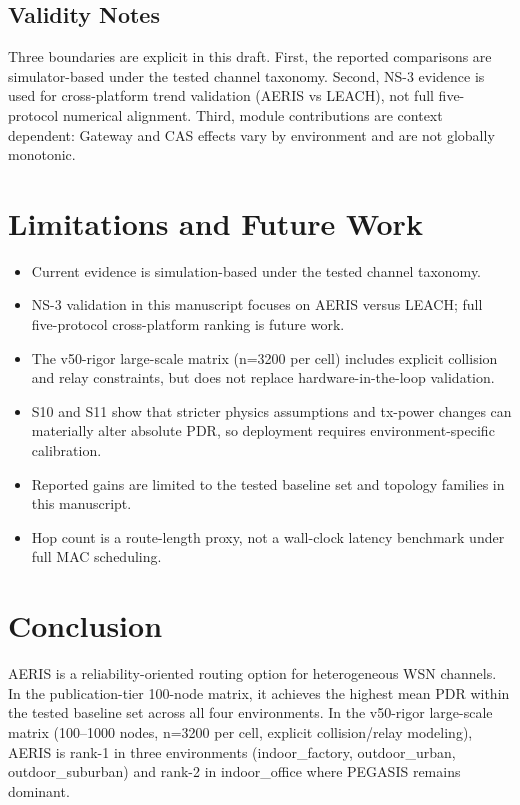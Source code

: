 ﻿\documentclass[sensors,article,submit,moreauthors,pdftex]{Definitions/mdpi}
\begin{document}
\subsection*{Validity Notes}
Three boundaries are explicit in this draft. First, the reported comparisons are simulator-based under the tested channel taxonomy. Second, NS-3 evidence is used for cross-platform trend validation (AERIS vs LEACH), not full five-protocol numerical alignment. Third, module contributions are context dependent: Gateway and CAS effects vary by environment and are not globally monotonic.

\section{Limitations and Future Work}
\begin{itemize}
\item Current evidence is simulation-based under the tested channel taxonomy.
\item NS-3 validation in this manuscript focuses on AERIS versus LEACH; full five-protocol cross-platform ranking is future work.
\item The v50-rigor large-scale matrix (n=3200 per cell) includes explicit collision and relay constraints, but does not replace hardware-in-the-loop validation.
\item S10 and S11 show that stricter physics assumptions and tx-power changes can materially alter absolute PDR, so deployment requires environment-specific calibration.
\item Reported gains are limited to the tested baseline set and topology families in this manuscript.
\item Hop count is a route-length proxy, not a wall-clock latency benchmark under full MAC scheduling.
\end{itemize}

\section{Conclusion}
AERIS is a reliability-oriented routing option for heterogeneous WSN channels. In the publication-tier 100-node matrix, it achieves the highest mean PDR within the tested baseline set across all four environments. In the v50-rigor large-scale matrix (100--1000 nodes, n=3200 per cell, explicit collision/relay modeling), AERIS is rank-1 in three environments (indoor\_factory, outdoor\_urban, outdoor\_suburban) and rank-2 in indoor\_office where PEGASIS remains dominant.
\end{document}
